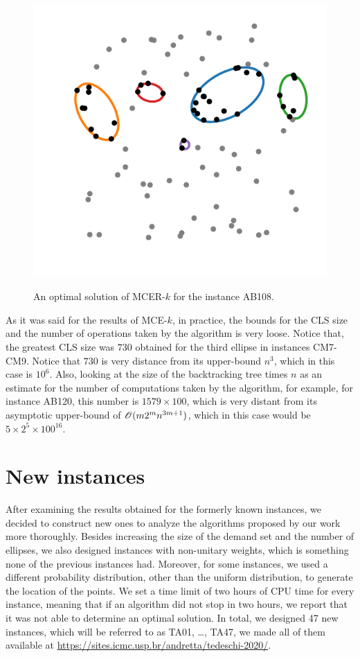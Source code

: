 \begin{figure}[!htb]
	\centering
	\caption{An optimal solution of MCER-$k$ for the instance AB108.}
	\includegraphics[scale=.8]{tex/figures/AB108}
	\fautor
	\label{fig:AB108}
\end{figure}

As it was said for the results of MCE-$k$, in practice, the bounds for the CLS size and the number of operations taken by the algorithm is very loose.
Notice that, the greatest CLS size was $730$ obtained for the third ellipse in instances CM7-CM9. Notice that $730$ is very distance from its upper-bound $n^3$, which in this case is $10^6$.
Also, looking at the size of the backtracking tree times $n$ as an estimate for the number of computations taken by the algorithm, for example, for instance AB120, this number is $1579 \times 100$, which is very distant from its asymptotic upper-bound of $\mathscr{O}(m2^mn^{3m+1})$, which in this case would be $5\times 2^5 \times 100 ^ {16}$.


\section{New instances}

After examining the results obtained for the formerly known instances, we decided to construct new ones to analyze the algorithms proposed by our work more thoroughly.
Besides increasing the size of the demand set and the number of ellipses, we also designed instances with non-unitary weights, which is something none of the previous instances had. 
Moreover, for some instances, we used a different probability distribution, other than the uniform distribution, to generate the location of the points.
We set a time limit of two hours of CPU time for every instance, meaning that if an algorithm did not stop in two hours, we report that it was not able to determine an optimal solution. 
In total, we designed 47 new instances, which will be referred to as TA01, \dots, TA47, we made all of them available at \url{https://sites.icmc.usp.br/andretta/tedeschi-2020/}.


